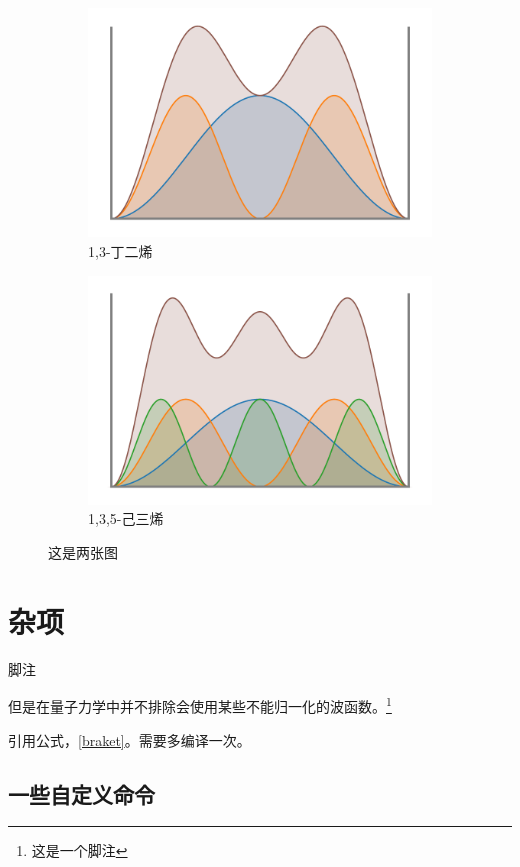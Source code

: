 \documentclass[11pt,a4paper,onecolumn]{article}
\begin{document}
\begin{figure}[H]
	\centering
	\begin{subfigure}[b]{0.45\textwidth}
		\centering
		\includegraphics[scale=0.45]{./fig/13-box.pdf}
		\caption{1,3-丁二烯}
	\end{subfigure}
	\begin{subfigure}[b]{0.45\textwidth}
		\centering
		\includegraphics[scale=0.45]{./fig/15-box.pdf}
		\caption{1,3,5-己三烯}
	\end{subfigure}
	\caption{这是两张图}
\end{figure}


\section{杂项}
脚注
\begin{note}	
	但是在量子力学中并不排除会使用某些不能归一化的波函数。\footnote{这是一个脚注}
\end{note}




引用公式，\eqref{braket}。需要多编译一次。

\subsection{一些自定义命令}
\end{document}
